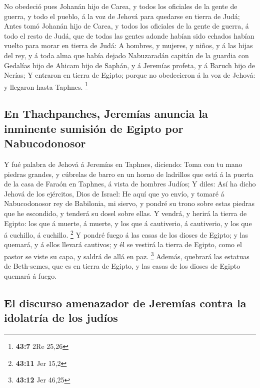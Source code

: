  No obedeció pues Johanán hijo de Carea, y todos los
oficiales de la gente de guerra, y todo el pueblo, á la voz de Jehová
para quedarse en tierra de Judá;  Antes tomó Johanán hijo de
Carea, y todos los oficiales de la gente de guerra, á todo el resto de
Judá, que de todas las gentes adonde habían sido echados habían vuelto
para morar en tierra de Judá:  A hombres, y mujeres, y
niños, y á las hijas del rey, y á toda alma que había dejado Nabuzaradán
capitán de la guardia con Gedalías hijo de Ahicam hijo de Saphán, y á
Jeremías profeta, y á Baruch hijo de Nerías;  Y entraron en
tierra de Egipto; porque no obedecieron á la voz de Jehová: y llegaron
hasta Taphnes. \footnote{\textbf{43:7} 2Re 25,26}

\hypertarget{en-thachpanches-jeremuxedas-anuncia-la-inminente-sumisiuxf3n-de-egipto-por-nabucodonosor}{%
\subsection{En Thachpanches, Jeremías anuncia la inminente sumisión de
Egipto por
Nabucodonosor}\label{en-thachpanches-jeremuxedas-anuncia-la-inminente-sumisiuxf3n-de-egipto-por-nabucodonosor}}

 Y fué palabra de Jehová á Jeremías en Taphnes, diciendo:
 Toma con tu mano piedras grandes, y cúbrelas de barro en un
horno de ladrillos que está á la puerta de la casa de Faraón en Taphnes,
á vista de hombres Judíos;  Y diles: Así ha dicho Jehová de
los ejércitos, Dios de Israel: He aquí que yo envío, y tomaré á
Nabucodonosor rey de Babilonia, mi siervo, y pondré su trono sobre estas
piedras que he escondido, y tenderá su dosel sobre ellas. 
Y vendrá, y herirá la tierra de Egipto: los que á muerte, á muerte, y
los que á cautiverio, á cautiverio, y los que á cuchillo, á cuchillo.
\footnote{\textbf{43:11} Jer 15,2}  Y pondré fuego á las
casas de los dioses de Egipto; y las quemará, y á ellos llevará
cautivos; y él se vestirá la tierra de Egipto, como el pastor se viste
su capa, y saldrá de allá en paz. \footnote{\textbf{43:12} Jer 46,25}
 Además, quebrará las estatuas de Beth-semes, que es en
tierra de Egipto, y las casas de los dioses de Egipto quemará á fuego.

\hypertarget{el-discurso-amenazador-de-jeremuxedas-contra-la-idolatruxeda-de-los-juduxedos}{%
\subsection{El discurso amenazador de Jeremías contra la idolatría de
los
judíos}\label{el-discurso-amenazador-de-jeremuxedas-contra-la-idolatruxeda-de-los-juduxedos}}

